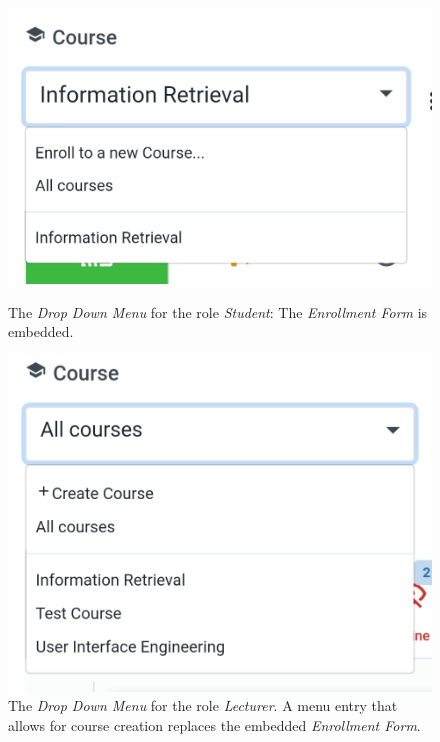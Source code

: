 \begin{figure}
	\centering
	\begin{minipage}[t]{.5\textwidth}
		\centering
		\includegraphics[width=0.95\linewidth]{screenshots/redesign/drop_down_student.jpg}
		\captionsetup{width=.8\linewidth}
		\caption{The \emph{Drop Down Menu} for the role \emph{Student}: The \emph{Enrollment Form} is embedded.}
		\label{fig:drop_down_student}
	\end{minipage}%
	\begin{minipage}[t]{.5\textwidth}
		\centering
		\includegraphics[width=0.95\linewidth]{screenshots/redesign/drop_down_lecturer.jpg}
		\captionsetup{width=.8\linewidth}
		\caption{The \emph{Drop Down Menu} for the role \emph{Lecturer}. A menu entry that allows for course creation replaces the embedded \emph{Enrollment Form}.}
		\label{fig:drop_down_lecturer}
	\end{minipage}
\end{figure}

